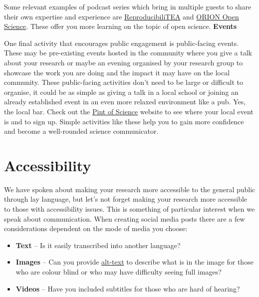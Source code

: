 \documentclass[
]{book}
\begin{document}
Some relevant examples of podcast series which bring in multiple guests to share their own expertise and experience are \href{https://soundcloud.com/reproducibilitea}{ReproducibiliTEA} and \href{https://www.orion-openscience.eu/publications/training-materials/201902/podcasts}{ORION Open Science}. These offer you more learning on the topic of open science. \textbf{Events}

One final activity that encourages public engagement is public-facing events. These may be pre-existing events hosted in the community where you give a talk about your research or maybe an evening organised by your research group to showcase the work you are doing and the impact it may have on the local community. These public-facing activities don't need to be large or difficult to organise, it could be as simple as giving a talk in a local school or joining an already established event in an even more relaxed environment like a pub. Yes, the local bar. Check out the \href{https://pintofscience.com/}{Pint of Science} website to see where your local event is and to sign up. Simple activities like these help you to gain more confidence and become a well-rounded science communicator.

\hypertarget{accessibility}{%
\section{Accessibility}\label{accessibility}}

We have spoken about making your research more accessible to the general public through lay language, but let's not forget making your research more accessible to those with accessibility issues. This is something of particular interest when we speak about communication. When creating social media posts there are a few considerations dependent on the mode of media you choose:

\begin{itemize}
\item
  \textbf{Text} -- Is it easily transcribed into another language?
\item
  \textbf{Images} -- Can you provide \href{https://abilitynet.org.uk/news-blogs/five-golden-rules-compliant-alt-text}{alt-text} to describe what is in the image for those who are colour blind or who may have difficulty seeing full images?
\item
  \textbf{Videos} -- Have you included subtitles for those who are hard of hearing?
\end{itemize}
\end{document}
